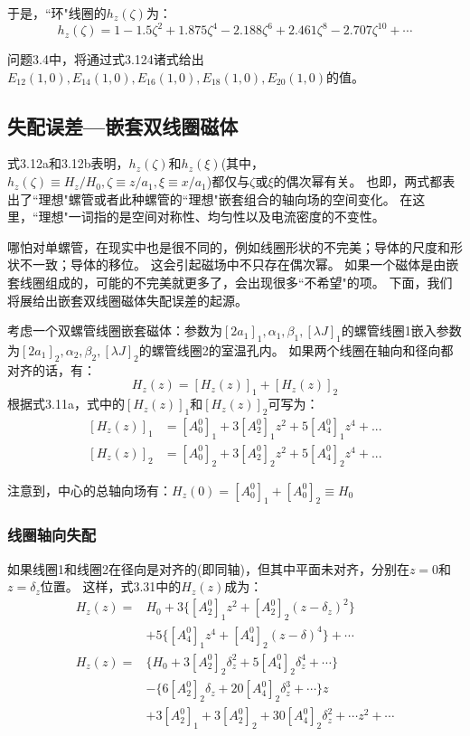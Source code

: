 于是，``环"线圈的$h_z(\zeta)$为：
\begin{equation}
  h_z(\zeta)=1-1.5\zeta^2+1.875\zeta^4-2.188\zeta^6+2.461\zeta^8-2.707\zeta^{10}+\cdots
\end{equation}

问题3.4中，将通过式3.124诸式给出$E_{12}(1,0),E_{14}(1,0),E_{16}(1,0),E_{18}(1,0),E_{20}(1,0)$的值。

\subsection{失配误差—嵌套双线圈磁体}
式3.12a和3.12b表明，$h_z(\zeta)$和$h_z(\xi)$(其中，$h_z(\zeta)\equiv H_z/H_0,\zeta\equiv z/a_1,\xi\equiv x/a_1$)都仅与$\zeta$或$\xi$的偶次幂有关。
也即，两式都表出了``理想"螺管或者此种螺管的``理想"嵌套组合的轴向场的空间变化。
在这里，``理想"一词指的是空间对称性、均匀性以及电流密度的不变性。

哪怕对单螺管，在现实中也是很不同的，例如线圈形状的不完美；导体的尺度和形状不一致；导体的移位。
这会引起磁场中不只存在偶次幂。
如果一个磁体是由嵌套线圈组成的，可能的不完美就更多了，会出现很多``不希望"的项。
下面，我们将展给出嵌套双线圈磁体失配误差的起源。

考虑一个双螺管线圈嵌套磁体：参数为$[2a_1]_1,\alpha_1,\beta_1,[\lambda J]_1$的螺管线圈1嵌入参数为$[2a_1]_2,\alpha_2,\beta_2,[\lambda J]_2$的螺管线圈2的室温孔内。
如果两个线圈在轴向和径向都对齐的话，有：
\begin{equation}
H_z(z)=[H_z(z)]_1+[H_z(z)]_2
\end{equation}
根据式3.11a，式中的$[H_z(z)]_1$和$[H_z(z)]_2$可写为：
\begin{subequations}
	\begin{align}
  [H_z(z)]_1 &= [A_0^0]_1 +3[A_2^0]_1 z^2+5[A_4^0]_1 z^4+... \\ 
  [H_z(z)]_2 &= [A_0^0]_2 +3[A_2^0]_2 z^2+5[A_4^0]_2 z^4+...
  \end{align}
\end{subequations}

注意到，中心的总轴向场有：$H_z(0)=[A_0^0]_1+[A_0^0]_2\equiv H_0$

\subsubsection{线圈轴向失配}
如果线圈1和线圈2在径向是对齐的(即同轴)，但其中平面未对齐，分别在$z=0$和$z=\delta_z$位置。
这样，式3.31中的$H_z(z)$成为：
\begin{subequations}
	\begin{align}
  H_z(z)=&H_0+3\{ [A_2^0]_1 z^2+[A_2^0]_2(z-\delta_z)^2\}\nonumber\\
  &+5\{[A_4^0]_1 z^4+[A_4^0]_2(z-\delta)^4\}+\cdots\\
H_z(z)=&\{H_0+3[A_2^0]_2 \delta_z^2+5[A_4^0]_2\delta_z^4+\cdots\}\nonumber\\
&-\{6[A_2^0]_2\delta_z+20[A_4^0]_2\delta_z^3+\cdots\}z\nonumber\\
&+{3[A_2^0]_1+3[A_2^0]_2+30[A_4^0]_2\delta_z^2+\cdots}z^2+\cdots
\end{align}
\end{subequations}

